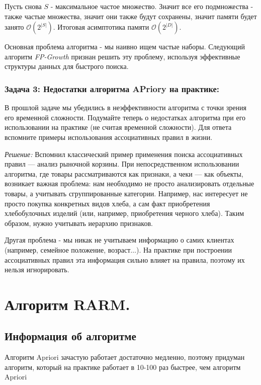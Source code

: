 Пусть снова \(S\) - максимальное частое множество. Значит все его подмножества - также частые множества, значит они также будут сохранены, значит памяти будет занято \(\mathcal{O}(2^{|S|})\). Итоговая асимптотика памяти \(\mathcal{O}(2^{|D|})\).

Основная проблема алгоритма - мы наивно ищем частые наборы. Следующий алгоритм \textit{FP-Growth} признан решить эту проблему, используя эффективные структуры данных для быстрого поиска.

\subsubsection{Задача 3: Недостатки алгоритма APriory на практике:} В прошлой задаче мы убедились в неэффективности алгоритма с точки зрения его временной сложности. Подумайте теперь о недостатках алгоритма при его использовании на практике (не считая временной сложности). Для ответа вспомните примеры использования ассоциативных правил в жизни.

\textit{Решение:} Вспомнил классический пример применения поиска ассоциативных правил — анализ рыночной корзины. При непосредственном использовании алгоритма, где товары рассматриваются как признаки, а чеки — как объекты, возникает важная проблема: нам необходимо не просто анализировать отдельные товары, а учитывать сгруппированные категории. Например, нас интересует не просто покупка конкретных видов хлеба, а сам факт приобретения хлебобулочных изделий (или, например, приобретения черного хлеба). Таким образом, нужно учитывать иерархию признаков.

Другая проблема - мы никак не учитываем информацию о самих клиентах (например, семейное положение, возраст\(\ldots\)). На практике при построении ассоциативных правил эта информация сильно влияет на правила, поэтому их нельзя игнорировать.

\section{Алгоритм RARM.}

\subsection{Информация об алгоритме}

Алгоритм Apriori зачастую работает достаточно медленно, поэтому придуман алгоритм, который на практике работает в 10-100 раз быстрее, чем алгоритм Apriori

